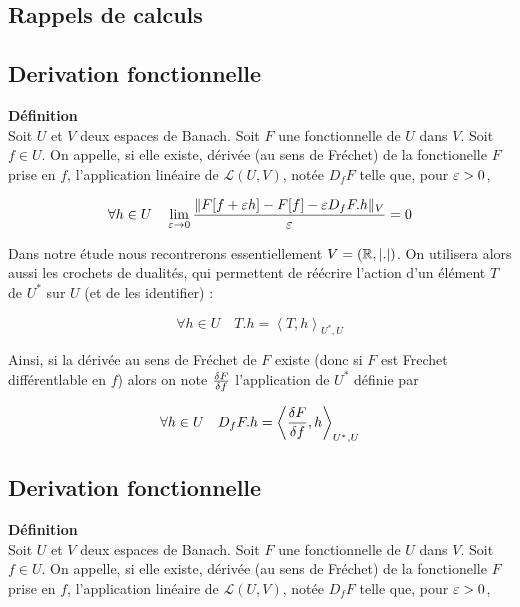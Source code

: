 \documentclass[10pt]{article}
\begin{document}
\begin{multicols}{2}
\section{Rappels de calculs}

\subsection{Derivation fonctionnelle}


\textbf{Définition}\\
Soit $U$ et $V$ deux espaces de Banach. Soit $F$ une fonctionnelle de $U$ dans $V$. 
Soit $f \in U$. On appelle, si elle existe, dérivée (au sens de Fréchet) de la fonctionelle $F$ prise en $f$, l'application linéaire de $\mathcal{L}(U,V)$, notée $D_fF$ telle que, pour $\varepsilon>0$, 

\begin{equation}
\forall h \in U \quad \lim_{ \varepsilon \rightarrow 0 } \frac{\| F[f+\varepsilon h] - F[f] - \varepsilon D_fF.h\|_V}{\varepsilon}  = 0
\end{equation} 


Dans notre étude nous recontrerons essentiellement $V = (\mathbb{R}, |.|)$. On utilisera alors aussi les crochets de dualités, qui permettent de réécrire l'action d'un élément $T$ de $U^*$ sur $U$ (et de les identifier) : 

\begin{equation}
  \forall h \in U \quad T.h = \left< T, h \right>_{U^*, U}
\end{equation}

Ainsi, si la dérivée au sens de Fréchet de $F$ existe (donc si $F$ est Frechet différentlable en $f$) alors on note $\frac{\delta F}{\delta f}$ l'application de $U^*$ définie par 

\begin{equation}
  \forall h \in U \quad D_fF.h = \left< \frac{\delta F}{\delta f}, h \right>_{U^*, U}
\end{equation}

\vspace*{11pt}
\subsection{Derivation fonctionnelle}


\textbf{Définition}\\
Soit $U$ et $V$ deux espaces de Banach. Soit $F$ une fonctionnelle de $U$ dans $V$. 
Soit $f \in U$. On appelle, si elle existe, dérivée (au sens de Fréchet) de la fonctionelle $F$ prise en $f$, l'application linéaire de $\mathcal{L}(U,V)$, notée $D_fF$ telle que, pour $\varepsilon>0$, 


\end{multicols}
\end{document}
